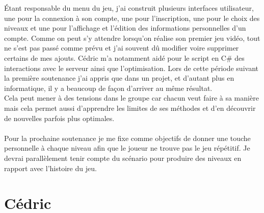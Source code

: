 \documentclass[titlepage, 13px, a4paper]{report}
\begin{document}
Étant responsable du menu du jeu, j'ai construit plusieurs interfaces utilisateur, une pour la connexion à son compte, 
une pour l'inscription, une pour le choix des niveaux et une pour l'affichage et l’édition des informations personnelles d'un compte. 
Comme on peut s'y attendre lorsqu'on réalise son premier jeu vidéo, tout ne s'est pas passé comme prévu et j'ai souvent dû modifier 
voire supprimer certains de mes ajouts. 
Cédric m'a notamment aidé pour le script en C\# des interactions avec le serveur ainsi que l'optimisation. 
Lors de cette période suivant la première soutenance j'ai appris que dans un projet, et d'autant plus en informatique, 
il y a beaucoup de façon d'arriver au même résultat.  \\
Cela peut mener à des tensions dans le groupe car chacun veut faire à sa manière mais cela permet aussi d'apprendre les limites de ses méthodes 
et d’en découvrir de nouvelles parfois plus optimales. \\ \\

Pour la prochaine soutenance je me fixe comme objectifs de donner
une touche personnelle à chaque niveau afin que le joueur ne trouve pas le jeu répétitif. Je devrai parallèlement tenir compte 
du scénario pour produire des niveaux en rapport avec l'histoire du jeu.


\newpage



\section{Cédric}
\end{document}
